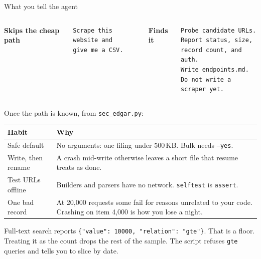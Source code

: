 \documentclass[9pt,aspectratio=169]{beamer}
\begin{document}
\begin{frame}[fragile]{What you tell the agent}

  \vspace{0.05cm}
  \begin{columns}[T,onlytextwidth]
    {\footnotesize\color{ccwarm}\bfseries Skips the cheap path}
    \begin{lstlisting}[style=shell]
Scrape this website and
give me a CSV.
    \end{lstlisting}

    {\footnotesize\color{bhblue}\bfseries Finds it}
    \begin{lstlisting}[style=shell]
Probe candidate URLs.
Report status, size,
record count, and auth.
Write endpoints.md.
Do not write a scraper yet.
    \end{lstlisting}
  \end{columns}

  \vspace{0.22cm}
  Once the path is known, from \texttt{sec\_edgar.py}:

  \vspace{0.08cm}
  \renewcommand{\arraystretch}{1.15}
  \footnotesize
  \begin{tabular}{@{}p{} p{}@{}}
    \toprule
    {\color{bhblue}\bfseries Habit} & {\color{bhblue}\bfseries Why} \\
    \midrule
    Safe default
      & No arguments: one filing under 500\,KB. Bulk needs \texttt{--yes}. \\
    Write, then rename
      & A crash mid-write otherwise leaves a short file that resume treats as done. \\
    Test URLs offline
      & Builders and parsers have no network. \texttt{selftest} is \texttt{assert}. \\
    One bad record
      & At 20{,}000 requests some fail for reasons unrelated to your code.
        Crashing on item 4{,}000 is how you lose a night. \\
    \bottomrule
  \end{tabular}

  \vspace{0.2cm}
  \footnotesize
  Full-text search reports \texttt{\{"value": 10000, "relation": "gte"\}}.
  That is a floor. Treating it as the count drops the rest of the sample.
  The script refuses \texttt{gte} queries and tells you to slice by date.

\end{frame}
\end{document}
